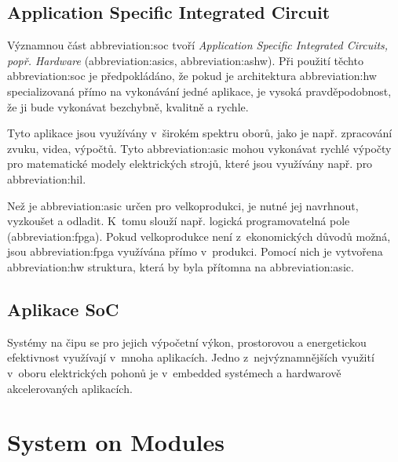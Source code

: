 \documentclass[a4paper, twoside, 11pt]{article}
\begin{document}
	\subsection{Application Specific Integrated Circuit}
		Významnou část \gls{abbreviation:soc} tvoří \textit{Application Specific Integrated Circuits, popř. Hardware} (\gls{abbreviation:asics}, \gls{abbreviation:ashw}). Při použití těchto \gls{abbreviation:soc} je předpokládáno, že pokud je architektura \gls{abbreviation:hw} specializovaná přímo na vykonávání jedné aplikace, je vysoká pravděpodobnost, že ji bude vykonávat bezchybně, kvalitně a rychle.\par
		Tyto aplikace jsou využívány v~širokém spektru oborů, jako je např. zpracování zvuku, videa, výpočtů. Tyto \gls{abbreviation:asic} mohou vykonávat rychlé výpočty pro matematické modely elektrických strojů, které jsou využívány např. pro \gls{abbreviation:hil}.\par
		Než je \gls{abbreviation:asic} určen pro velkoprodukci, je nutné jej navrhnout, vyzkoušet a odladit. K~tomu slouží např. logická programovatelná pole (\gls{abbreviation:fpga}). Pokud velkoprodukce není z~ekonomických důvodů možná, jsou \gls{abbreviation:fpga} využívána přímo v~produkci. Pomocí nich je vytvořena \gls{abbreviation:hw} struktura, která by byla přítomna na \gls{abbreviation:asic}.


	\subsection{Aplikace SoC}
	Systémy na čipu se pro jejich výpočetní výkon, prostorovou a energetickou efektivnost využívají v~mnoha aplikacích. Jedno z~nejvýznamnějších využití v~oboru elektrických pohonů je v~embedded systémech a hardwarově akcelerovaných aplikacích.

\section{System on Modules}\label{sec:system-on-modules}
\end{document}
